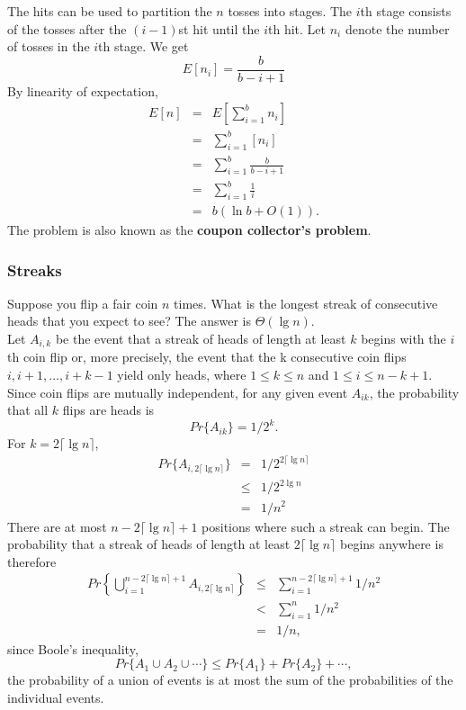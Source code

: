 \documentclass[12pt]{article}
\begin{document}
The hits can be used to partition the $n$ tosses into stages. The $i$th stage consists of the tosses after the $(i-1)$st hit until the $i$th hit. Let $n_i$ denote the number of tosses in the $i$th stage. We get
\begin{equation*}
  E[n_i] = \frac {b}{b - i + 1}
\end{equation*}
By linearity of expectation,
\begin{eqnarray*}
  E[n]
  &=& E \left[ \sum_{i=1}^b n_i  \right] \\
  &=& \sum_{i=1}^b [n_i] \\
  &=& \sum_{i=1}^b \frac {b}{b-i+1} \\
  &=& \sum_{i=1}^b \frac {1}{i} \\
  &=& b( \ln b + O(1)).
\end{eqnarray*}
The problem is also known as the \textbf {coupon collector's problem}.

\subsubsection{Streaks}

Suppose you flip a fair coin $n$ times. What is the longest streak of consecutive heads that you expect to see? The answer is $\Theta (\lg n)$. \\

Let $A_{i,k}$ be the event that a streak of heads of length at least $k$ begins with the $i$th coin flip or, more precisely, the event that the k consecutive coin flips $i, i + 1, \dots, i + k -1$ yield only heads, where $1 \le k \le n$ and $1 \le i \le n - k + 1$. Since coin flips are mutually independent, for any given event $A_{ik}$, the probability that all $k$ flips are heads is
\begin{equation*}
  Pr \{ A_{ik} \} = 1 / 2^k.
\end{equation*}
For $k = 2 \lceil \lg n \rceil$,
\begin{eqnarray*}
  Pr \{ A_{i, 2 \lceil \lg n \rceil} \}
  &=& 1 / 2^{2 \lceil \lg n \rceil} \\
  &\le& 1 / 2^{2 \lg n} \\
  &=& 1 / n^2
\end{eqnarray*}
There are at most $n - 2 \lceil \lg n \rceil + 1$ positions where such a streak can begin. The probability that a streak of heads of length at least $2 \lceil \lg n \rceil$ begins anywhere is therefore
\begin{eqnarray*}
  Pr \left\{ \bigcup_{i=1}^{n - 2 \lceil \lg n \rceil + 1} A_{i,2 \lceil \lg n \rceil} \right\}
  &\le&  \sum_{i=1}^{n - 2 \lceil \lg n \rceil + 1} 1 / n^2 \\
  &<& \sum_{i=1}^n 1 / n^2 \\
  &=& 1/n,
\end{eqnarray*}
since Boole's inequality,
\begin{equation*}
  Pr \{ A_1 \cup A_2 \cup \cdots \} \le Pr \{ A_1 \} + Pr \{ A_2 \} + \cdots,
\end{equation*}
the probability of a union of events is at most the sum of the probabilities of the individual events. \\
\end{document}
